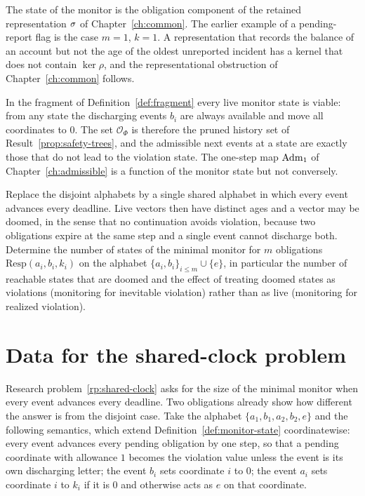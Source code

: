 The state of the monitor is the obligation component of the retained representation $\sigma$ of Chapter~\ref{ch:common}. The earlier example of a pending-report flag is the case $m=1$, $k=1$. A representation that records the balance of an account but not the age of the oldest unreported incident has a kernel that does not contain $\ker\rho$, and the representational obstruction of Chapter~\ref{ch:common} follows.

\begin{remark}
In the fragment of Definition~\ref{def:fragment} every live monitor state is viable: from any state the discharging events $b_i$ are always available and move all coordinates to $0$. The set $\mathcal O_\Phi$ is therefore the pruned history set of Result~\ref{prop:safety-trees}, and the admissible next events at a state are exactly those that do not lead to the violation state. The one-step map $\operatorname{Adm}_1$ of Chapter~\ref{ch:admissible} is a function of the monitor state but not conversely.
\end{remark}

\begin{researchproblem}\label{rp:shared-clock}
Replace the disjoint alphabets by a single shared alphabet in which every event advances every deadline. Live vectors then have distinct ages and a vector may be doomed, in the sense that no continuation avoids violation, because two obligations expire at the same step and a single event cannot discharge both. Determine the number of states of the minimal monitor for $m$ obligations $\mathrm{Resp}(a_i,b_i,k_i)$ on the alphabet $\{a_i,b_i\}_{i\le m}\cup\{e\}$, in particular the number of reachable states that are doomed and the effect of treating doomed states as violations (monitoring for inevitable violation) rather than as live (monitoring for realized violation).
\end{researchproblem}


\section{Data for the shared-clock problem}\label{sec:shared-data}

Research problem~\ref{rp:shared-clock} asks for the size of the minimal monitor when every event advances every deadline. Two obligations already show how different the answer is from the disjoint case. Take the alphabet $\{a_1,b_1,a_2,b_2,e\}$ and the following semantics, which extend Definition~\ref{def:monitor-state} coordinatewise: every event advances every pending obligation by one step, so that a pending coordinate with allowance $1$ becomes the violation value unless the event is its own discharging letter; the event $b_i$ sets coordinate $i$ to $0$; the event $a_i$ sets coordinate $i$ to $k_i$ if it is $0$ and otherwise acts as $e$ on that coordinate.

